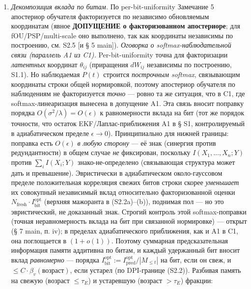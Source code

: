 \documentclass[12pt]{iopart}
\providecommand{\tightlist}{\setlength{\itemsep}{0pt}\setlength{\parskip}{0pt}}
\begin{document}
\begin{enumerate}

\def\labelenumi{(\alph{enumi})}

\tightlist

\item

  \emph{Декомпозиция вклада по битам.} По per-bit-uniformity \cite{Andriishin2026b} Замечание 5 апостериор обучателя факторизуется по независимо обновляемым координатам (явное \textbf{ДОПУЩЕНИЕ о факторизованном апостериоре}; для fOU/PSP/multi-scale оно выполнено, так как координаты независимы по построению, см. S2.5 {[}и § 5 main{]}). \emph{Оговорка о softmax-наблюдательной связи (параллель A1 из C1).} Per-bit-uniformity точна для факторизации \emph{латентных} координат \(\theta_{ij}\) (приращения \(dW_{ij}\) независимы по построению, S1.1). Но наблюдаемая \(P(t)\) строится \emph{построчным softmax}, связывающим координаты строки общей нормировкой, поэтому апостериор обучателя по наблюдениям не факторизуется \emph{точно} --- ровно та же ситуация, что в C1, где softmax-линеаризация вынесена в допущение A1. Эта связь вносит поправку порядка \(O(\sigma^2/\lambda) = O(\epsilon)\) к равномерности вклада на бит (тот же порядок точности, что остаток EKF/Лаплас-приближения A1 в § S1, контролируемый в адиабатическом пределе \(\epsilon \to 0\)). Принципиально для нижней границы: поправка есть \(O(\epsilon)\) \emph{в любую сторону} --- её знак (синергия против редундантности) в общем случае \emph{не} фиксирован, поскольку \(I(X_1,\dots,X_n;Y)\) против \(\sum_i I(X_i;Y)\) знако-не-определено (связывающая структура может дать и превышение). Эвристически в адиабатическом около-гауссовом пределе положительная корреляция свежих битов строки скорее \emph{уменьшает} их совокупный независимый вклад относительно факторизованной оценки \(N_{\text{fresh}}\cdot I^{\text{opt}}_{\text{bit}}\) (верхняя мажоранта в (S2.2a)--(b)), поднимая пол --- но это эвристический, не доказанный знак. Строгий контроль этой softmax-поправки (точная неравномерность вклада на бит при связанной нормировке) --- открыт (§ 7 main, п. iv); в пределах адиабатического приближения, как и A1 в C1, она поглощается в \((1+o(1))\). Поэтому суммарная предсказательная информация памяти аддитивна по битам, и каждый удержанный бит вносит вклад \emph{равномерно} --- порядка \(I^{\text{opt}}_{\text{bit}} := I_{\text{pred}}^{\text{opt}}/|M_{\le t}|\) на бит, если он свеж, и \(\le C\cdot\beta_v(\text{возраст})\), если устарел (по DPI-границе (S2.2)). Разбивая память на свежую (возраст \(\le \tau_E\)) и устаревшую (возраст \(> \tau_E\)) фракции:

\end{enumerate}
\end{document}
